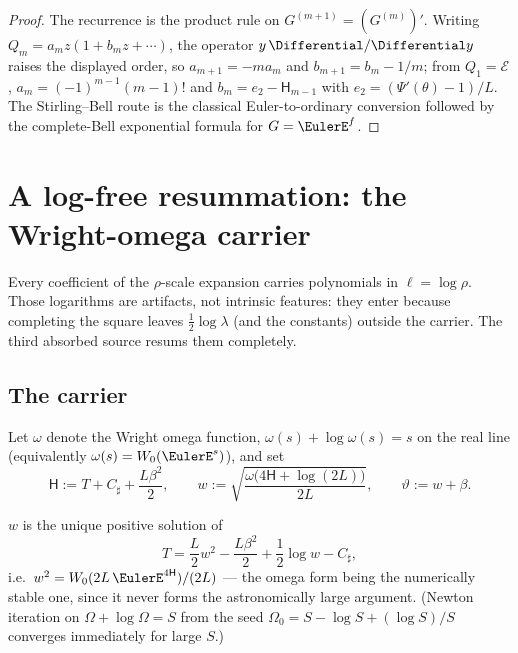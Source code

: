 \documentclass[11pt,oneside]{article}
\numberwithin{equation}{section}
\theoremstyle{definition}
\theoremstyle{remark}
\newcommand{\LambertW}{W}
\newcommand{\Csharp}{C_{\sharp}}
\newcommand{\Hnum}{\mathsf H}
\begin{document}
\begin{proof}
The recurrence is the product rule on
$G^{(m+1)}=(G^{(m)})'$.  Writing
$Q_m=a_mz(1+b_mz+\cdots)$, the operator $y\,\Differential/\Differential y$ raises the
displayed order, so $a_{m+1}=-ma_m$ and $b_{m+1}=b_m-1/m$; from
$Q_1=\mathcal E$, $a_m=(-1)^{m-1}(m-1)!$ and
$b_m=e_2-\Hnum_{m-1}$ with $e_2=(\Psi'(\theta)-1)/L$.  The
Stirling--Bell route is the classical Euler-to-ordinary conversion
followed by the complete-Bell exponential formula for
$G=\EulerE^{f}$.
\end{proof}


\section{A log-free resummation: the Wright-omega carrier}
\label{sec:wcarrier}

Every coefficient of the $\rho$-scale expansion carries polynomials in
$\ell=\log\rho$.  Those logarithms are artifacts, not intrinsic
features: they enter because completing the square leaves
$\tfrac12\log\lambda$ (and the constants) outside the carrier.  The
third absorbed source resums them completely.

\subsection{The carrier}

Let $\omega$ denote the Wright omega function,
$\omega(s)+\log\omega(s)=s$ on the real line
(equivalently $\omega(s)=\LambertW_0(\EulerE^{s})$), and set
\begin{equation}
 \mathsf H:=T+\Csharp+\frac{L\beta^{2}}2,
 \qquad
 w:=\sqrt{\frac{\omega\bigl(4\mathsf H+\log(2L)\bigr)}{2L}},
 \qquad
 \vartheta:=w+\beta.
 \label{eq:w-def}
\end{equation}

\begin{proposition}
\label{prop:carrier-equation}
$w$ is the unique positive solution of
\begin{equation}
 T=\frac L2w^{2}-\frac{L\beta^{2}}2+\frac12\log w-\Csharp,
 \label{eq:w-carrier}
\end{equation}
i.e.\ $w^{2}=\LambertW_0(2L\,\EulerE^{4\mathsf H})/(2L)$ --- the omega form
being the numerically stable one, since it never forms the
astronomically large argument.  (Newton iteration on
$\Omega+\log\Omega=S$ from the seed $\Omega_0=S-\log S+(\log S)/S$
converges immediately for large $S$.)
\end{proposition}
\end{document}
